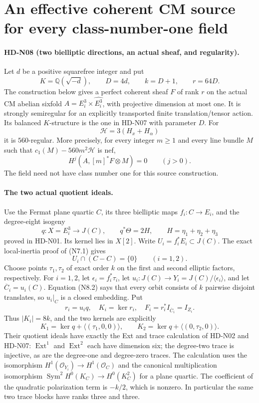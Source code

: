 \section{An effective coherent CM source for every class-number-one field}

\paragraph{HD-N08 (two bielliptic directions, an actual sheaf, and regularity).}
Let $d$ be a positive squarefree integer and put
\[
 K=\mathbb Q(\sqrt{-d}),\qquad D=4d,\qquad k=D+1,\qquad r=64D.
\]
The construction below gives a perfect coherent sheaf $F$ of rank $r$
on the actual CM abelian sixfold $A=E_i^3\times\widehat{E_i^3}$,
with projective dimension at most one. It is strongly semiregular for
an explicitly transported finite translation/tensor action. Its
balanced $K$-structure is the one in HD-N07 with parameter $D$.
For
\[
 \mathcal H=3(H_x+H_\alpha)
\]
it is $560$-regular. More precisely, for every integer $m\ge1$ and
every line bundle $M$ such that $c_1(M)-560m^2\mathcal H$ is nef,
\[
 H^j(A,[m]^*F\otimes M)=0\qquad(j>0).                 \tag{N8.1}
\]
The field need not have class number one for this source construction.

\paragraph{The two actual quotient ideals.}
Use the Fermat plane quartic $C$, its three bielliptic maps
$f_i:C\to E_i$, and the degree-eight isogeny
\[
 q:X=E_i^3\longrightarrow J(C),\qquad q^*\Theta=2H,
 \qquad H=\eta_1+\eta_2+\eta_3
\]
proved in HD-N01. Its kernel lies in $X[2]$. Write
$U_i=f_i^*E_i\subset J(C)$. The exact local-inertia proof of
(N7.1) gives
\[
 U_i\cap(C-C)=\{0\}\qquad(i=1,2).                    \tag{N8.2}
\]
Choose points $\tau_1,\tau_2$ of exact order $k$ on the first and
second elliptic factors, respectively. For $i=1,2$, let
$\epsilon_i=f_i^*\tau_i$, let
$u_i:J(C)\to Y_i=J(C)/\langle\epsilon_i\rangle$, and let
$\overline C_i=u_i(C)$. Equation (N8.2) says that every orbit
consists of $k$ pairwise disjoint translates, so $u_i|_C$ is a
closed embedding. Put
\[
 r_i=u_iq,\quad K_i=\ker r_i,\quad
 F_i=r_i^*I_{\overline C_i}=I_{Z_i}.
\]
Thus $|K_i|=8k$, and the two kernels are explicitly
\[
 K_1=\ker q+\langle(\tau_1,0,0)\rangle,\qquad
 K_2=\ker q+\langle(0,\tau_2,0)\rangle.                \tag{N8.3}
\]
Their quotient ideals have exactly the Ext and trace calculation
of HD-N02 and HD-N07: $\operatorname{Ext}^1$ and
$\operatorname{Ext}^2$ each have dimension six; the degree-two
trace is injective, as are the degree-one and degree-zero traces.
The calculation uses the isomorphism
$H^1(\mathcal O_{Y_i})\to H^1(\mathcal O_C)$ and the canonical
multiplication isomorphism
$\operatorname{Sym}^2H^0(K_C)\to H^0(K_C^2)$ for a plane quartic.
The coefficient of the quadratic polarization term is $-k/2$,
which is nonzero. In particular the same two trace blocks have
ranks three and three.

